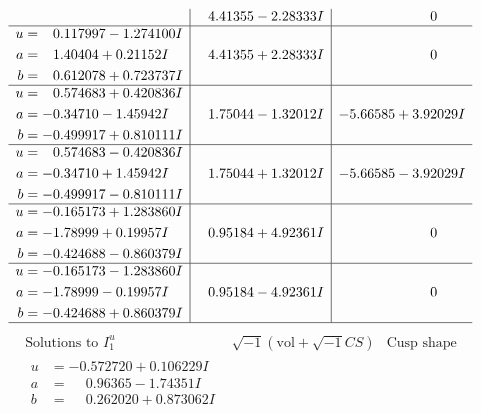 \documentclass[1p]{elsarticle_modified}
\theoremstyle{definition}
\newcommand{\I}{\sqrt{-1}}
\begin{document}
$$\begin{array}{c|c|c}
 & \phantom{-}4.41355 - 2.28333 I & \phantom{-0.000000 } 0 \\ \hline\begin{aligned}
u &= \phantom{-}0.117997 - 1.274100 I \\
a &= \phantom{-}1.40404 + 0.21152 I \\
b &= \phantom{-}0.612078 + 0.723737 I\end{aligned}
 & \phantom{-}4.41355 + 2.28333 I & \phantom{-0.000000 } 0 \\ \hline\begin{aligned}
u &= \phantom{-}0.574683 + 0.420836 I \\
a &= -0.34710 - 1.45942 I \\
b &= -0.499917 + 0.810111 I\end{aligned}
 & \phantom{-}1.75044 - 1.32012 I & -5.66585 + 3.92029 I \\ \hline\begin{aligned}
u &= \phantom{-}0.574683 - 0.420836 I \\
a &= -0.34710 + 1.45942 I \\
b &= -0.499917 - 0.810111 I\end{aligned}
 & \phantom{-}1.75044 + 1.32012 I & -5.66585 - 3.92029 I \\ \hline\begin{aligned}
u &= -0.165173 + 1.283860 I \\
a &= -1.78999 + 0.19957 I \\
b &= -0.424688 - 0.860379 I\end{aligned}
 & \phantom{-}0.95184 + 4.92361 I & \phantom{-0.000000 } 0 \\ \hline\begin{aligned}
u &= -0.165173 - 1.283860 I \\
a &= -1.78999 - 0.19957 I \\
b &= -0.424688 + 0.860379 I\end{aligned}
 & \phantom{-}0.95184 - 4.92361 I & \phantom{-0.000000 } 0\\
 \hline 
 \end{array}$$\newpage$$\begin{array}{c|c|c}  
\text{Solutions to }I^u_{1}& \I (\text{vol} + \sqrt{-1}CS) & \text{Cusp shape}\\
 \hline 
\begin{aligned}
u &= -0.572720 + 0.106229 I \\
a &= \phantom{-}0.96365 - 1.74351 I \\
b &= \phantom{-}0.262020 + 0.873062 I\end{aligned}

\end{array}$$
\end{document}
